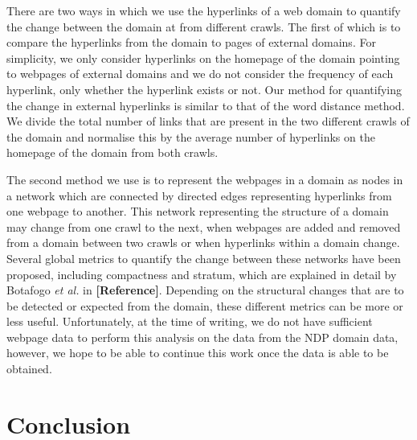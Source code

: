 \documentclass[10pt, a4paper]{article}
\begin{document}
 There are two ways in which we use the hyperlinks of a web domain to quantify the change between the domain at from different crawls.
 The first of which is to compare the hyperlinks from the domain to pages of external domains.
 For simplicity, we only consider hyperlinks on the homepage of the domain pointing to webpages of external domains and we do not consider the frequency of each hyperlink, only whether the hyperlink exists or not.
 Our method for quantifying the change in external hyperlinks is similar to that of the word distance method.
 We divide the total number of links that are present in the two different crawls of the domain and normalise this by the average number of hyperlinks on the homepage of the domain from both crawls.
 
 The second method we use is to represent the webpages in a domain as nodes in a network which are connected by directed edges representing hyperlinks from one webpage to another.
 This network representing the structure of a domain may change from one crawl to the next, when webpages are added and removed from a domain between two crawls or when hyperlinks within a domain change.
 Several global metrics to quantify the change between these networks have been proposed, including compactness and stratum, which are explained in detail by Botafogo \textit{et al.} in \textbf{[Reference]}.
 Depending on the structural changes that are to be detected or expected from the domain, these different metrics can be more or less useful.
 Unfortunately, at the time of writing, we do not have sufficient webpage data to perform this analysis on the data from the NDP domain data, however, we hope to be able to continue this work once the data is able to be obtained.
 

\section{Conclusion}



\end{document}
